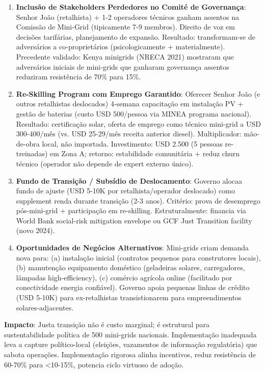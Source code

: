 \documentclass[12pt, a4paper]{article}
\begin{document}
\begin{enumerate}
\item \textbf{Inclusão de Stakeholders Perdedores no Comité de Governança}: Senhor João (retalhista) + 1-2 operadores técnicos ganham assentos na Comissão de Mini-Grid (tipicamente 7-9 membros). Direito de voz em decisões tarifárias, planejamento de expansão. Resultado: transformam-se de adversários a co-proprietários (psicologicamente + materialmente). Precedente validado: Kenya minigrids (NRECA 2021) mostraram que adversários iniciais de mini-grids que ganharam governança assentos reduziram resistência de 70\% para 15\%.

\item \textbf{Re-Skilling Program com Emprego Garantido}: Oferecer Senhor João (e outros retalhistas deslocados) 4-semana capacitação em instalação PV + gestão de baterias (custo USD 500/pessoa via MINEA programa nacional). Resultado: certificação solar, oferta de emprego como técnico mini-grid a USD 300-400/mês (vs. USD 25-29/mês receita anterior diesel). Multiplicador: mão-de-obra local, não importada. Investimento: USD 2.500 (5 pessoas re-treinadas) em Zona A; retorno: estabilidade comunitária + reduz churn técnico (operador não depende de expert externo único).

\item \textbf{Fundo de Transição / Subsídio de Deslocamento}: Governo alocaa fundo de ajuste (USD 5-10K por retalhista/operador deslocado) como supplement renda durante transição (2-3 anos). Critério: prova de desemprego pós-mini-grid + participação em re-skilling. Estruturalmente: financia via World Bank social-risk mitigation envelope ou GCF Just Transition facility (novo 2024).

\item \textbf{Oportunidades de Negócios Alternativos}: Mini-grids criam demanda nova para: (a) instalação inicial (contratos pequenos para construtores locais), (b) manutenção equipamento doméstico (geladeiras solares, carregadores, lâmpadas high-efficiency), (c) comércio agrícola online (facilitado por conectividade energia confiável). Governo apoia pequenas linhas de crédito (USD 5-10K) para ex-retalhistas transistionarem para empreendimentos solares-adjacentes.

\end{enumerate}

\textbf{Impacto}: Justa transição não é custo marginal; é estrutural para sustentabilidade política de 500 mini-grids nacionais. Implementação inadequada leva a capture político-local (eleições, vazamentos de informação regulatória) que sabota operações. Implementação rigorosa alinha incentivos, reduz resistência de 60-70\% para <10-15\%, potencia ciclo virtuoso de adoção.
\end{document}
